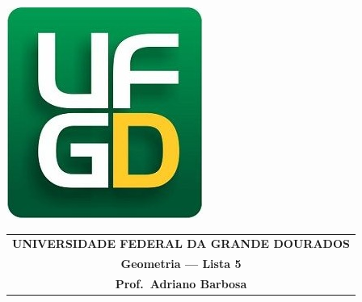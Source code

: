 \documentclass[a4paper,5pt]{amsbook}
\begin{document}
\thispagestyle{empty}
\pagestyle{empty}
\begin{minipage}[h]{0.14\textwidth}
	\includegraphics[scale=0.24]{../../ufgd.png}
\end{minipage}
\begin{minipage}[h]{\textwidth}
\begin{tabular}{c}
{{\bf UNIVERSIDADE FEDERAL DA GRANDE DOURADOS}}\\
{{\bf Geometria --- Lista 5}}\\
{{\bf Prof.\ Adriano Barbosa}}\\
\end{tabular}
\vspace{-0.45cm}
%
\end{minipage}

\end{document}
